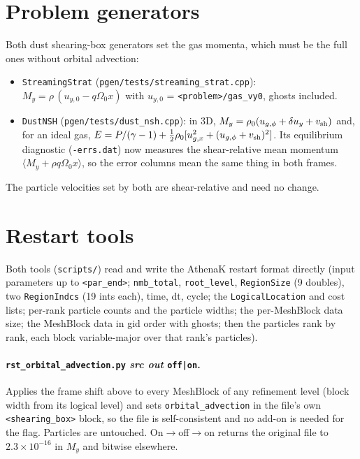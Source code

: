 \documentclass[11pt]{article}
\newcommand{\code}[1]{\texttt{#1}}
\newcommand{\file}[1]{\texttt{\small #1}}
\newcommand{\fn}[1]{\texttt{\small #1}}
\newcommand{\Om}{\Omega_0}
\newcommand{\qom}{q\Om}
\newcommand{\vsh}{v_{\rm sh}}
\begin{document}
\section{Problem generators}

Both dust shearing-box generators set the gas momenta, which must be the full ones
without orbital advection:
\begin{itemize}
\item \fn{StreamingStrat} (\file{pgen/tests/streaming\_strat.cpp}):
  $M_y = \rho\,(u_{y,0} - \qom x)$ with $u_{y,0}$ = \code{<problem>/gas\_vy0}, ghosts
  included.
\item \fn{DustNSH} (\file{pgen/tests/dust\_nsh.cpp}): in 3D,
  $M_y = \rho_0(u_{g,\phi} + \delta u_y + \vsh)$ and, for an ideal gas,
  $E = P/(\gamma-1) + \frac12\rho_0[u_{g,x}^2 + (u_{g,\phi}+\vsh)^2]$.  Its equilibrium
  diagnostic (\code{-errs.dat}) now measures the shear-relative mean momentum
  $\langle M_y + \rho\qom x\rangle$, so the error columns mean the same thing in both
  frames.
\end{itemize}
The particle velocities set by both are shear-relative and need no change.

\section{Restart tools}

Both tools (\file{scripts/}) read and write the AthenaK restart format directly (input
parameters up to \code{<par\_end>}; \code{nmb\_total}, \code{root\_level},
\code{RegionSize} (9 doubles), two \code{RegionIndcs} (19 ints each), time, dt, cycle; the
\code{LogicalLocation} and cost lists; per-rank particle counts and the particle widths;
the per-MeshBlock data size; the MeshBlock data in gid order with ghosts; then the
particles rank by rank, each block variable-major over that rank's particles).

\paragraph{\file{rst\_orbital\_advection.py} \textit{src out} \code{off|on}.}  Applies the
frame shift above to every MeshBlock of any refinement level (block width from its
logical level) and sets \code{orbital\_advection} in the file's own \code{<shearing\_box>}
block, so the file is self-consistent and no add-on is needed for the flag.  Particles are
untouched.  On$\to$off$\to$on returns the original file to $2.3\times10^{-16}$ in $M_y$
and bitwise elsewhere.
\end{document}
